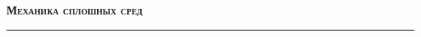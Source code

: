 \documentclass[12pt]{article}
\theoremstyle{example}
\theoremstyle{plain}
\theoremstyle{definition}
\theoremstyle{remark}
\numberwithin{remark}{section}
\begin{document}
	
	\begin{center}
		\Huge \bf	
		\textsc{Механика сплошных сред}
		\rule{\textwidth}{0.4pt}
	\end{center}
	
	\tableofcontents\newpage
  
  
  
  
  
  
  

  
  

  
  
  
  

  
  
  
  
  
  

  
  
  
  
  
  
  

  
  
  

  
  
  
  
  
  
  
\end{document}
